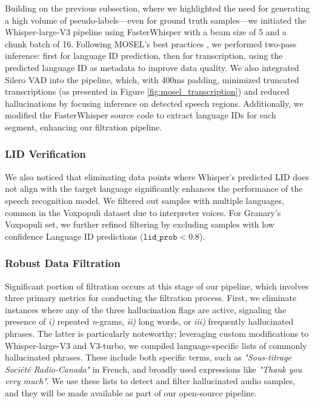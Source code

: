 Building on the previous subsection, where we highlighted the need for generating a high volume of pseudo-labels—even for ground truth samples—we initiated the Whisper-large-V3 pipeline using FasterWhisper\cite{faster-whisper} with a beam size of 5 and a chunk batch of 16. Following MOSEL's best practices \cite{mosel}, we performed two-pass inference: first for language ID prediction, then for transcription, using the predicted language ID as metadata to improve data quality. We also integrated Silero VAD \cite{silerovad} into the pipeline, which, with 400ms padding, minimized truncated transcriptions (as presented in Figure \ref{fig:mosel_transcription}) and reduced hallucinations by focusing inference on detected speech regions. Additionally, we modified the FasterWhisper source code to extract language IDs for each segment, enhancing our filtration pipeline.


\subsubsection{LID Verification}
We also noticed that eliminating data points where Whisper's predicted LID does not align with the target language significantly enhances the performance of the speech recognition model. 
We filtered out samples with multiple languages, common in the Voxpopuli dataset due to interpreter voices. For Granary's Voxpopuli set, we further refined filtering by excluding samples with low confidence Language ID predictions  ($\texttt{lid\_prob} < 0.8$).



\subsubsection{Robust Data Filtration}

Significant portion of filtration occurs at this stage of our pipeline, which involves three primary metrics for conducting the filtration process. First, we eliminate instances where any of the three hallucination flags are active, signaling the presence of \textit{i)} repeated \textit{n}-grams, \textit{ii)} long words, or \textit{iii)} frequently hallucinated phrases. The latter is particularly noteworthy; leveraging custom modifications to Whisper-large-V3 and V3-turbo, we compiled language-specific lists of commonly hallucinated phrases. These include both specific terms, such as \textit{"Sous-titrage Société Radio-Canada"} in French, and broadly used expressions like \textit{"Thank you very much"}. We use these lists to detect and filter hallucinated audio samples, and they will be made available as part of our open-source pipeline.

